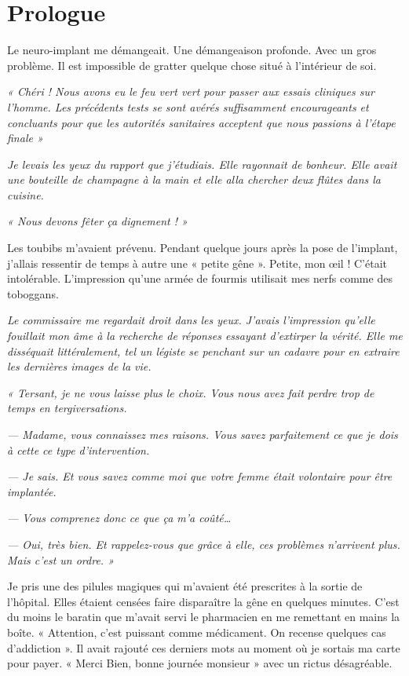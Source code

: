 \chapter{Prologue}

Le neuro-implant me démangeait. Une démangeaison profonde. Avec un gros problème. Il est impossible de gratter quelque
chose situé à l'intérieur de soi.

\emph{« Chéri ! Nous avons eu le feu vert vert pour passer aux essais cliniques sur l'homme. Les précédents tests se 
sont avérés suffisamment encourageants et concluants pour que les autorités sanitaires acceptent que nous passions à 
l'étape finale »}

\emph{Je levais les yeux du rapport que j'étudiais. Elle rayonnait de bonheur. Elle avait une bouteille de champagne à 
la main et elle alla chercher deux flûtes dans la cuisine.}

\emph{« Nous devons fêter ça dignement ! »}

Les toubibs m'avaient prévenu. Pendant quelque jours après la pose de l'implant, j'allais ressentir de temps à autre
une « petite gêne ». Petite, mon œil ! C'était intolérable. L'impression qu'une armée de fourmis utilisait mes nerfs
comme des toboggans. 

\emph{Le commissaire me regardait droit dans les yeux. J'avais l'impression qu'elle fouillait mon âme à la recherche de 
réponses essayant d'extirper la vérité. Elle me disséquait littéralement, tel un légiste se penchant sur un cadavre pour 
en extraire les dernières images de la vie.}

\emph{« Tersant, je ne vous laisse plus le choix. Vous nous avez fait perdre trop de temps en tergiversations.}

\emph{— Madame, vous connaissez mes raisons. Vous savez parfaitement ce que je dois à cette ce type d'intervention.}

\emph{— Je sais. Et vous savez comme moi que votre femme était volontaire pour être implantée.}

\emph{— Vous comprenez donc ce que ça m'a coûté…}

\emph{— Oui, très bien. Et rappelez-vous que grâce à elle, ces problèmes n'arrivent plus. Mais c'est un ordre. »}

Je pris une des pilules magiques qui m'avaient été prescrites à la sortie de l'hôpital. Elles étaient censées faire 
disparaître la gêne en quelques minutes. C'est du moins le baratin que m'avait servi le pharmacien en me remettant en 
mains la boîte. « Attention, c'est puissant comme médicament. On recense quelques cas d'addiction ». Il avait rajouté 
ces derniers mots au moment où je sortais ma carte pour payer. « Merci Bien, bonne journée monsieur » avec un rictus 
désagréable.

